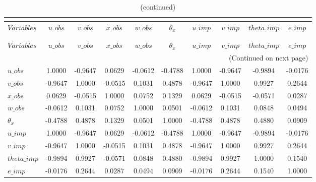  
\begin{center}
\begin{longtable}{lccccccccc} 
\caption{MATRIX OF CORRELATIONS}\\
 \label{Table:th_corr_matrix}\\
\toprule 
$Variables   $	 & 	 $       u\_obs$	 & 	 $       v\_obs$	 & 	 $       x\_obs$	 & 	 $       w\_obs$	 & 	 $   {\theta_x}$	 & 	 $       u\_imp$	 & 	 $       v\_imp$	 & 	 $   theta\_imp$	 & 	 $       e\_imp$\\
\midrule \endfirsthead 
\caption{(continued)}\\
 \toprule \\ 
$Variables   $	 & 	 $       u\_obs$	 & 	 $       v\_obs$	 & 	 $       x\_obs$	 & 	 $       w\_obs$	 & 	 $   {\theta_x}$	 & 	 $       u\_imp$	 & 	 $       v\_imp$	 & 	 $   theta\_imp$	 & 	 $       e\_imp$\\
\midrule \endhead 
\midrule \multicolumn{10}{r}{(Continued on next page)} \\ \bottomrule \endfoot 
\bottomrule \endlastfoot 
$u\_obs      $	 & 	        1.0000	 & 	       -0.9647	 & 	        0.0629	 & 	       -0.0612	 & 	       -0.4788	 & 	        1.0000	 & 	       -0.9647	 & 	       -0.9894	 & 	       -0.0176 \\ 
$v\_obs      $	 & 	       -0.9647	 & 	        1.0000	 & 	       -0.0515	 & 	        0.1031	 & 	        0.4878	 & 	       -0.9647	 & 	        1.0000	 & 	        0.9927	 & 	        0.2644 \\ 
$x\_obs      $	 & 	        0.0629	 & 	       -0.0515	 & 	        1.0000	 & 	        0.0752	 & 	        0.1329	 & 	        0.0629	 & 	       -0.0515	 & 	       -0.0571	 & 	        0.0287 \\ 
$w\_obs      $	 & 	       -0.0612	 & 	        0.1031	 & 	        0.0752	 & 	        1.0000	 & 	        0.0501	 & 	       -0.0612	 & 	        0.1031	 & 	        0.0848	 & 	        0.0494 \\ 
${\theta_x}  $	 & 	       -0.4788	 & 	        0.4878	 & 	        0.1329	 & 	        0.0501	 & 	        1.0000	 & 	       -0.4788	 & 	        0.4878	 & 	        0.4880	 & 	        0.0909 \\ 
$u\_imp      $	 & 	        1.0000	 & 	       -0.9647	 & 	        0.0629	 & 	       -0.0612	 & 	       -0.4788	 & 	        1.0000	 & 	       -0.9647	 & 	       -0.9894	 & 	       -0.0176 \\ 
$v\_imp      $	 & 	       -0.9647	 & 	        1.0000	 & 	       -0.0515	 & 	        0.1031	 & 	        0.4878	 & 	       -0.9647	 & 	        1.0000	 & 	        0.9927	 & 	        0.2644 \\ 
$theta\_imp  $	 & 	       -0.9894	 & 	        0.9927	 & 	       -0.0571	 & 	        0.0848	 & 	        0.4880	 & 	       -0.9894	 & 	        0.9927	 & 	        1.0000	 & 	        0.1540 \\ 
$e\_imp      $	 & 	       -0.0176	 & 	        0.2644	 & 	        0.0287	 & 	        0.0494	 & 	        0.0909	 & 	       -0.0176	 & 	        0.2644	 & 	        0.1540	 & 	        1.0000 \\ 
\end{longtable}
 \end{center}
